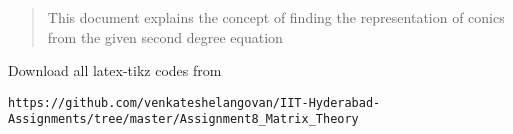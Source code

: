 \documentclass[journal,12pt,twocolumn]{IEEEtran}
\begin{document}
% 
\maketitle
\newpage
\bigskip
\renewcommand{\thefigure}{\theenumi}
\renewcommand{\thetable}{\theenumi}
%
%
\begin{abstract}
This document explains the concept of finding the representation of conics from the given second degree equation
\end{abstract}
Download all latex-tikz codes from 
%
\begin{lstlisting}
https://github.com/venkateshelangovan/IIT-Hyderabad-Assignments/tree/master/Assignment8_Matrix_Theory
\end{lstlisting}
%
\end{document}
